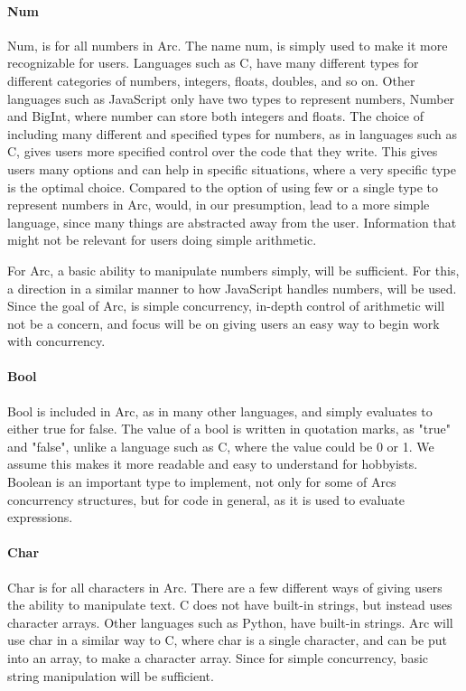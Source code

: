 \paragraph*{Num}
Num, is for all numbers in Arc. The name num, is simply used to make it more recognizable for users. Languages such as C, have many different types for different categories of numbers, integers, floats, doubles, and so on. Other languages such as JavaScript only have two types to represent numbers, Number and BigInt, where number can store both integers and floats.
The choice of including many different and specified types for numbers, as in languages such as C, gives users more specified control over the code that they write. This gives users many options and can help in specific situations, where a very specific type is the optimal choice.
Compared to the option of using few or a single type to represent numbers in Arc, would, in our presumption, lead to a more simple language, since many things are abstracted away from the user. Information that might not be relevant for users doing simple arithmetic.

For Arc, a basic ability to manipulate numbers simply, will be sufficient. For this, a direction in a similar manner to how JavaScript handles numbers, will be used. Since the goal of Arc, is simple concurrency, in-depth control of arithmetic will not be a concern, and focus will be on giving users an easy way to begin work with concurrency.

\paragraph*{Bool}
Bool is included in Arc, as in many other languages, and simply evaluates to either true for false. The value of a bool is written in quotation marks, as "true" and "false", unlike a language such as C, where the value could be 0 or 1. We assume this makes it more readable and easy to understand for hobbyists. Boolean is an important type to implement, not only for some of Arcs concurrency structures, but for code in general, as it is used to evaluate expressions. 

\paragraph*{Char}
Char is for all characters in Arc. There are a few different ways of giving users the ability to manipulate text. C does not have built-in strings, but instead uses character arrays. Other languages such as Python, have built-in strings. Arc will use char in a similar way to C, where char is a single character, and can be put into an array, to make a character array. Since for simple concurrency, basic string manipulation will be sufficient.


